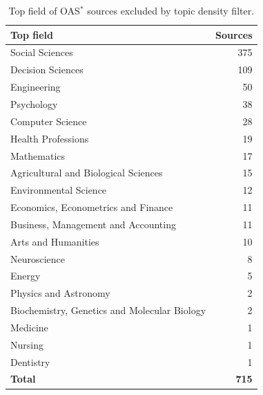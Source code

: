 \begin{table}[htbp]
\centering
\caption{Top field of OAS$^*$ sources excluded by topic density filter.}
\label{tab:oas_dropped}
\begin{tabular}{lr}
\toprule
\textbf{Top field} & \textbf{Sources} \\
\midrule
Social Sciences & 375 \\
Decision Sciences & 109 \\
Engineering & 50 \\
Psychology & 38 \\
Computer Science & 28 \\
Health Professions & 19 \\
Mathematics & 17 \\
Agricultural and Biological Sciences & 15 \\
Environmental Science & 12 \\
Economics, Econometrics and Finance & 11 \\
Business, Management and Accounting & 11 \\
Arts and Humanities & 10 \\
Neuroscience & 8 \\
Energy & 5 \\
Physics and Astronomy & 2 \\
Biochemistry, Genetics and Molecular Biology & 2 \\
Medicine & 1 \\
Nursing & 1 \\
Dentistry & 1 \\
\midrule
\textbf{Total} & \textbf{715} \\
\bottomrule
\end{tabular}
\end{table}
